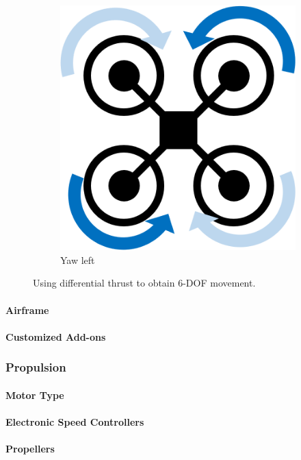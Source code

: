 \begin{figure}[h]
	~
	\begin{subfigure}[b]{0.3\textwidth}
		\centering
		\includegraphics[scale=0.4]{img/drone_x_yaw}
		\caption{Yaw left}
		\label{fig:x-yaw}
	\end{subfigure}
	
	\caption{Using differential thrust to obtain 6-DOF movement. }
	\label{fig:rpas_6dof}
\end{figure}

\paragraph{Airframe}
\paragraph{Customized Add-ons}

\subsubsection{Propulsion}
\paragraph{Motor Type}
\paragraph{Electronic Speed Controllers}
\paragraph{Propellers}

